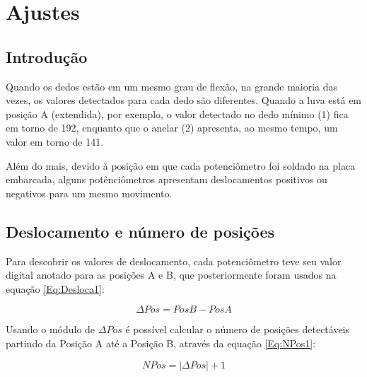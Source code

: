 \documentclass[
	12pt,				%
	openright,			%
	oneside,			%
	a4paper,			%
	english,			%
	brazil				%
	]{abntex2}
\begin{document}
				





		\section{Ajustes}
		
		\subsection{Introdução}

		Quando os dedos estão em um mesmo grau de flexão, na grande maioria das vezes, os valores detectados para cada dedo são diferentes. Quando a luva está em posição A (extendida), por exemplo, o valor detectado no dedo mínimo (1) fica em torno de 192, enquanto que o anelar (2) apresenta, ao mesmo tempo, um valor em torno de 141.	
		
		Além do mais, devido à posição em que cada potenciômetro foi soldado na placa embarcada, alguns potênciômetros apresentam deslocamentos positivos ou negativos para um mesmo movimento. 
	
		\subsection{Deslocamento e número de posições}

		Para descobrir os valores de deslocamento, cada potenciômetro teve seu valor digital anotado para as posições A e B, que posteriormente foram usados na equação \ref{Eq:Desloca1}:

	\begin{equation}
			\Delta Pos 	= Pos B 	- 	Pos A
		\label{Eq:Desloca1}
	\end{equation}

		Usando o módulo de $\Delta Pos$ é possível calcular o número de posições detectáveis partindo da Posição A até a Posição B, através da equação \ref{Eq:NPos1}:

	\begin{equation}
			NPos = |\Delta Pos| + 1
		\label{Eq:NPos1}
	\end{equation}
\end{document}
